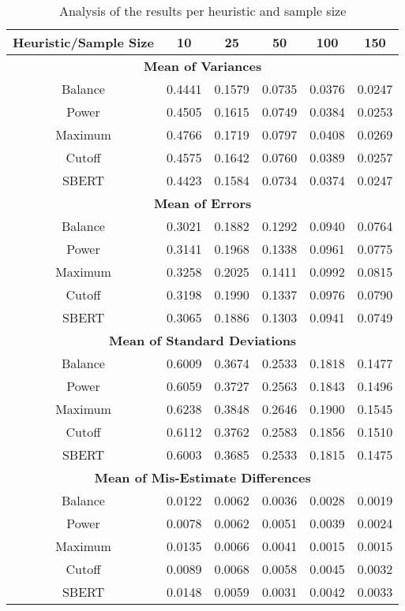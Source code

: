 \documentclass{article}
\begin{document}
\begin{table}[H]
\centering
\begin{tabular}{|c|c|c|c|c|c|}
\hline
\textbf{Heuristic/Sample Size} & \textbf{10} & \textbf{25} & \textbf{50} & \textbf{100} & \textbf{150} \\ \hline
\multicolumn{6}{|c|}{\textbf{Mean of Variances}} \\ \hline
Balance & 0.4441 & 0.1579 & 0.0735 & 0.0376 & 0.0247 \\ \hline
Power & 0.4505 & 0.1615 & 0.0749 & 0.0384 & 0.0253 \\ \hline
Maximum & 0.4766 & 0.1719 & 0.0797 & 0.0408 & 0.0269 \\ \hline
Cutoff & 0.4575 & 0.1642 & 0.0760 & 0.0389 & 0.0257 \\ \hline
SBERT & 0.4423 & 0.1584 & 0.0734 & 0.0374 & 0.0247 \\ \hline
\multicolumn{6}{|c|}{\textbf{Mean of Errors}} \\ \hline
Balance & 0.3021 & 0.1882 & 0.1292 & 0.0940 & 0.0764 \\ \hline
Power & 0.3141 & 0.1968 & 0.1338 & 0.0961 & 0.0775 \\ \hline
Maximum & 0.3258 & 0.2025 & 0.1411 & 0.0992 & 0.0815 \\ \hline
Cutoff & 0.3198 & 0.1990 & 0.1337 & 0.0976 & 0.0790 \\ \hline
SBERT & 0.3065 & 0.1886 & 0.1303 & 0.0941 & 0.0749 \\ \hline
\multicolumn{6}{|c|}{\textbf{Mean of Standard Deviations}} \\ \hline
Balance & 0.6009 & 0.3674 & 0.2533 & 0.1818 & 0.1477 \\ \hline
Power & 0.6059 & 0.3727 & 0.2563 & 0.1843 & 0.1496 \\ \hline
Maximum & 0.6238 & 0.3848 & 0.2646 & 0.1900 & 0.1545 \\ \hline
Cutoff & 0.6112 & 0.3762 & 0.2583 & 0.1856 & 0.1510 \\ \hline
SBERT & 0.6003 & 0.3685 & 0.2533 & 0.1815 & 0.1475 \\ \hline
\multicolumn{6}{|c|}{\textbf{Mean of Mis-Estimate Differences}} \\ \hline
Balance & 0.0122 & 0.0062 & 0.0036 & 0.0028 & 0.0019 \\ \hline
Power & 0.0078 & 0.0062 & 0.0051 & 0.0039 & 0.0024 \\ \hline
Maximum & 0.0135 & 0.0066 & 0.0041 & 0.0015 & 0.0015 \\ \hline
Cutoff & 0.0089 & 0.0068 & 0.0058 & 0.0045 & 0.0032 \\ \hline
SBERT & 0.0148 & 0.0059 & 0.0031 & 0.0042 & 0.0033 \\ \hline
\end{tabular}
\caption{Analysis of the results per heuristic and sample size}
\label{table:heuristic_analysis}
\end{table}
\end{document}
